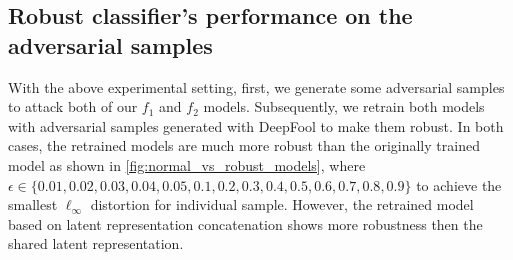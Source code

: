 \subsection{Robust classifier's performance on the adversarial samples}
With the above experimental setting, first, we generate some adversarial samples to attack both of our $f_1$ and $f_2$ models. Subsequently, we retrain both models with adversarial samples generated with DeepFool to make them robust. In both cases, the retrained models are much more robust than the originally trained model as shown in \cref{fig:normal_vs_robust_models}, where $\epsilon \in\{0.01, 0.02, 0.03, 0.04, 0.05, 0.1, 0.2, 0.3, 0.4, 0.5, 0.6, 0.7, 0.8, 0.9\}$ to achieve the smallest $\ell_{\infty}$ distortion for individual sample. However, the retrained model based on latent representation concatenation shows more robustness then the shared latent representation. 

